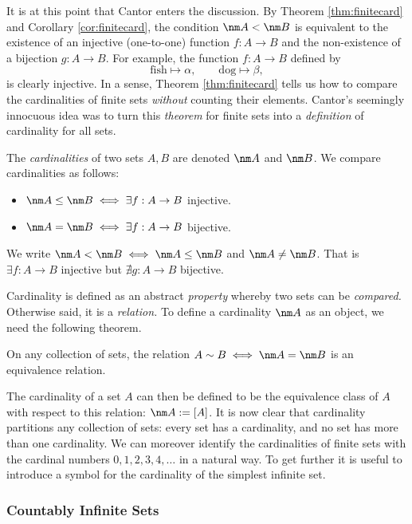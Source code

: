 It is at this point that Cantor enters the discussion. By Theorem \ref{thm:finitecard} and Corollary \ref{cor:finitecard}, the condition $\nm A<\nm B$ is equivalent to the existence of an injective (one-to-one) function $f:A\to B$ and the non-existence of a bijection $g:A\to B$. For example, the function $f:A\to B$ defined by
\[\text{fish}\longmapsto\alpha,\qquad\text{dog}\longmapsto\beta,\]
is clearly injective. In a sense, Theorem \ref{thm:finitecard} tells us how to compare the cardinalities of finite sets \emph{without} counting their elements. Cantor's seemingly innocuous idea was to turn this \emph{theorem} for finite sets into a \emph{definition} of cardinality for all sets.\pagebreak[4]

\begin{defn}\label{defn:infcard}
The \emph{cardinalities} of two sets $A,B$ are denoted $\nm A$ and $\nm B$. We compare cardinalities as follows:
\begin{itemize}
  \item $\nm A\le\nm B\iff\exists f:A\to B$ injective.
  \item $\nm A=\nm B\iff\exists f:A\to B$ bijective.
\end{itemize}
We write $\nm A<\nm B\iff \nm A\le \nm B$ and $\nm A\neq \nm B$. That is $\exists f:A\to B$ injective but $\nexists g:A\to B$ bijective.
\end{defn}

\noindent Cardinality is defined as an abstract \emph{property} whereby two sets can be \emph{compared.} Otherwise said, it is a \emph{relation.} To define a cardinality $\nm A$ as an object, we need the following theorem.

\begin{thm}\label{thm:cardequiv}
On any collection of sets, the relation $A\sim B\iff\nm A=\nm B$ is an equivalence relation.
\end{thm}

\noindent The cardinality of a set $A$ can then be defined to be the equivalence class of $A$ with respect to this relation: $\nm A:=[A]$. It is now clear that cardinality partitions any collection of sets: every set has a cardinality, and no set has more than one cardinality. We can moreover identify the cardinalities of finite sets with the cardinal numbers $0,1,2,3,4,\ldots$ in a natural way. To get further it is useful to introduce a symbol for the cardinality of the simplest infinite set.

\subsubsection*{Countably Infinite Sets}


